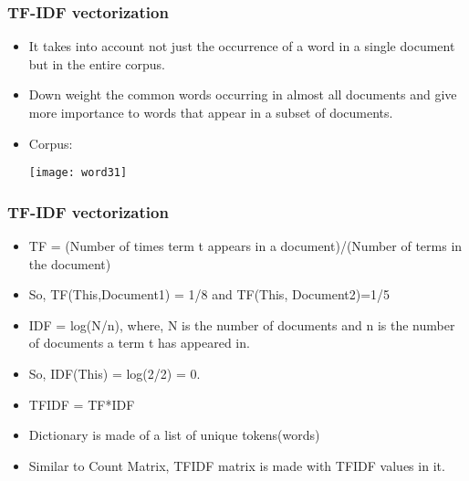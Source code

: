 


\begin{frame}[fragile]\frametitle{TF-IDF vectorization}
\begin{itemize}
\item It takes into account not just the occurrence of a word in a single document but in the entire corpus.
\item Down weight the common words occurring in almost all documents and give more importance to words that appear in a subset of documents.
\item Corpus:
\begin{center}
\texttt{[image: word31]}
\end{center}
\end{itemize}
\end{frame}

\begin{frame}[fragile]\frametitle{TF-IDF vectorization}
\begin{itemize}
\item TF = (Number of times term t appears in a document)/(Number of terms in the document)
\item So, TF(This,Document1) = 1/8  and TF(This, Document2)=1/5
\item IDF = log(N/n), where, N is the number of documents and n is the number of documents a term t has appeared in.
\item So, IDF(This) = log(2/2) = 0.
\item TFIDF = TF*IDF
\item Dictionary is made of a list of unique tokens(words) 
\item Similar to Count Matrix, TFIDF matrix is made with TFIDF values in it.
\end{itemize}
\end{frame}

